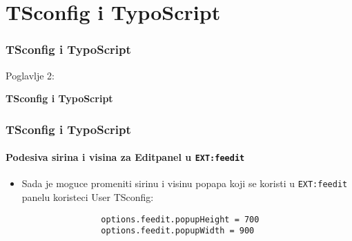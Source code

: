 %

\section{TSconfig i TypoScript}
\begin{frame}[fragile]
	\frametitle{TSconfig i TypoScript}

	\begin{center}\huge{Poglavlje 2:}\end{center}
	\begin{center}\huge{\color{typo3darkgrey}\textbf{TSconfig i TypoScript}}\end{center}

\end{frame}


\begin{frame}[fragile]
	\frametitle{TSconfig i TypoScript}
	\framesubtitle{Podesiva sirina i visina za Editpanel u \texttt{EXT:feedit}}

	\lstset{basicstyle=\small\ttfamily}

	\begin{itemize}

		\item Sada je moguce promeniti sirinu i visinu popapa koji se koristi u
			\texttt{EXT:feedit} panelu koristeci User TSconfig:
			\begin{lstlisting}
				options.feedit.popupHeight = 700
				options.feedit.popupWidth = 900
			\end{lstlisting}

	\end{itemize}

\end{frame}

